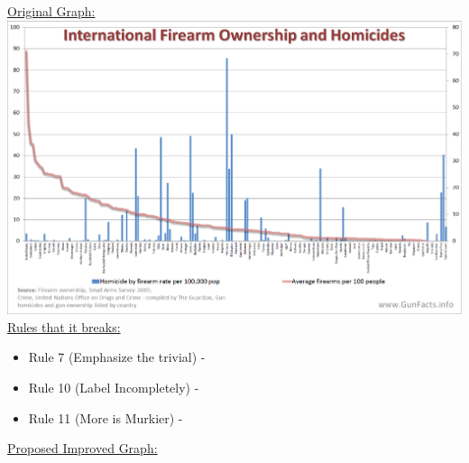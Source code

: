 \documentclass[12pt,letterpaper,final]{article}
\begin{document}
\begin{enumerate}
\underline{Original Graph:}\\
\includegraphics[scale=0.75]{Bad_Graph.png}\\
\underline{Rules that it breaks:}
\begin{itemize}
  \item Rule 7 (Emphasize the trivial) - 
  \item Rule 10 (Label Incompletely) - 
  \item Rule 11 (More is Murkier) - 
\end{itemize}
\underline{Proposed Improved Graph:}\\


\end{enumerate}
\end{document}
